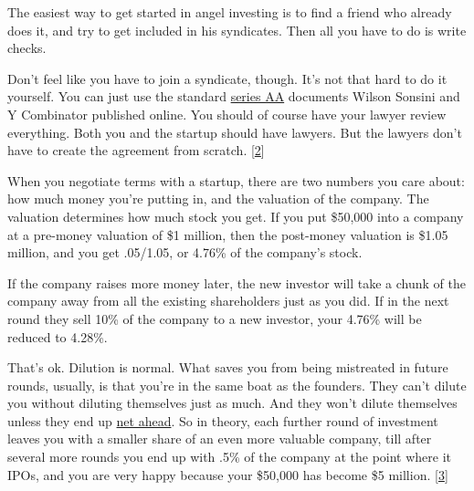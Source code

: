 The easiest way to get started in angel
                  investing is to find a friend who already does it, and try to
                  get included in his syndicates. Then all you have to do is
                  write checks.

Don't feel like you have to join a
                  syndicate, though. It's not that hard to do it yourself. You
                  can just use the standard
                  \href{http://ycombinator.com/seriesaa.html}{series AA}
                  documents Wilson Sonsini and Y Combinator published online.
                  You should of course have your lawyer review everything. Both
                  you and the startup should have lawyers. But the lawyers don't
                  have to create the agreement from scratch.
                  [\href{\#f2n}{2}]


                  When you negotiate terms with a startup, there are two numbers
                  you care about: how much money you're putting in, and the
                  valuation of the company. The valuation determines how much
                  stock you get. If you put \$50,000 into a company at a
                  pre-money valuation of \$1 million, then the post-money
                  valuation is \$1.05 million, and you get .05/1.05, or 4.76\% of
                  the company's stock.

If the company raises more
                  money later, the new investor will take a chunk of the company
                  away from all the existing shareholders just as you did. If in
                  the next round they sell 10\% of the company to a new investor,
                  your 4.76\% will be reduced to 4.28\%.

That's ok.
                  Dilution is normal. What saves you from being mistreated in
                  future rounds, usually, is that you're in the same boat as the
                  founders. They can't dilute you without diluting themselves
                  just as much. And they won't dilute themselves unless they end
                  up \href{http://www.paulgraham.com/equity.html}{net ahead}. So in theory, each
                  further round of investment leaves you with a smaller share of
                  an even more valuable company, till after several more rounds
                  you end up with .5\% of the company at the point where it IPOs,
                  and you are very happy because your \$50,000 has become \$5
                  million.
                  [\href{\#f3n}{3}]

